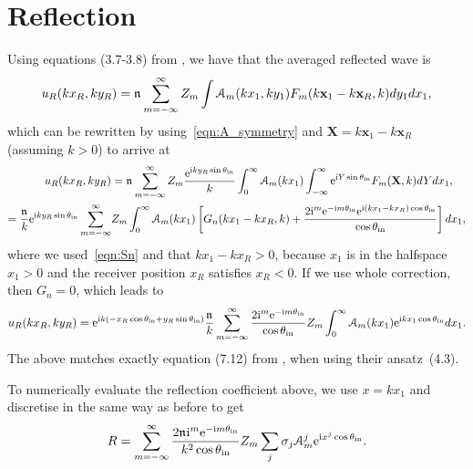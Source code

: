 \documentclass[12pt, a4paper]{article}
\begin{document}
\section{Reflection}

Using equations (3.7-3.8) from \cite{gower_reflection_2018}, we have that the averaged reflected wave is
\begin{equation}
  u_R(kx_R,ky_R) = \mathfrak n_{} \sum_{m=-\infty}^\infty Z_m \int \mathcal A_m(kx_1,ky_1) F_m(k\mathbf x_1 - k\mathbf x_R,k) dy_1 dx_1,
\end{equation}
which can be rewritten by using~\eqref{eqn:A_symmetry} and $\mathbf X = k\mathbf x_1 - k\mathbf x_R$ (assuming $k>0$) to arrive at
\begin{align}
  u_R(kx_R,ky_R) &= \mathfrak n_{} \sum_{m=-\infty}^\infty Z_m \frac{\textrm{e}^{ \textrm{i} k y_R \sin \theta_{\mathrm{in}}}}{k} \int_{0}^\infty \mathcal A_m(kx_1) \int_{-\infty}^\infty \textrm{e}^{ \textrm{i} Y \sin \theta_{\mathrm{in}}} F_m(\mathbf X,k) dY dx_1,
  \\ \notag
   =  \frac{\mathfrak n_{}}{k} \textrm{e}^{ \textrm{i} k y_R \sin \theta_{\mathrm{in}}} \sum_{m=-\infty}^\infty &Z_m \int_{0}^\infty \mathcal A_m(kx_1) \left [ G_n(kx_1 - k x_R, k) + \frac{2 \textrm{i}^m \textrm{e}^{-\textrm{i} m \theta_{\mathrm{in}}} \textrm{e}^{\textrm{i} (kx_1 - k x_R) \cos \theta_{\mathrm{in}}}}{\cos \theta_{\mathrm{in}}} \right] d x_1,
\end{align}
where we used~\eqref{eqn:Sn} and that $kx_1 - k x_R > 0$, because $x_1$ is in the halfspace $x_1 >0$ and the receiver position $x_R$ satisfies $x_R<0$. If we use whole correction, then $G_n = 0$, which leads to
\begin{equation}
  u_R(kx_R,ky_R) =   \textrm{e}^{ \textrm{i} k ( - x_R \cos \theta_{\mathrm{in}} + y_R \sin \theta_{\mathrm{in}} )} \frac{\mathfrak n_{}}{k} \sum_{m=-\infty}^\infty \frac{2 \textrm{i}^m \textrm{e}^{-\textrm{i} m \theta_{\mathrm{in}}}}{\cos \theta_{\mathrm{in}}} Z_m  \int_{0}^\infty \mathcal A_m(kx_1) \textrm{e}^{\textrm{i} k x_1 \cos \theta_{\mathrm{in}}}  d x_1.
\end{equation}
The above matches exactly equation (7.12) from \cite{gower_reflection_2018}, when using their ansatz~(4.3).

To numerically evaluate the reflection coefficient above, we use $x = k x_1$ and discretise in the same way as before to get
\begin{equation}
  R =   \sum_{m=-\infty}^\infty \frac{2 \mathfrak n_{} \textrm{i}^m \textrm{e}^{-\textrm{i} m \theta_{\mathrm{in}}}}{k^2 \cos \theta_{\mathrm{in}}} Z_m  \sum_{j} \sigma_j \mathcal A_m^j \textrm{e}^{\textrm{i} x^j \cos \theta_{\mathrm{in}}}.
\end{equation}

\printbibliography

% 
% 
\end{document}
